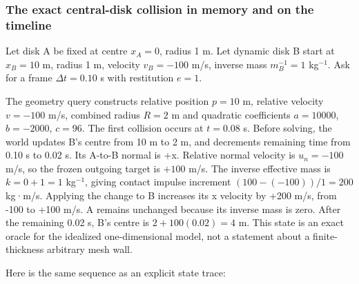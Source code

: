 \subsubsection{The exact central-disk collision in memory and on the timeline}\label{06-engine-ii-ch046-the-exact-central-disk-collision-in-memory-and-on-the-timeline}

\hypertarget{06-engine-ii-ch046-the-exact-central-disk-collision-in-memory-and-on-the-timeline}{}

Let disk A be fixed at centre \(x_A=0\), radius 1 m. Let dynamic disk B start at \(x_B=10\) m, radius 1 m, velocity \(v_B=-100\) m/s, inverse mass \(m_B^{-1}=1\) kg\(^{-1}\). Ask for a frame \(\Delta t=0.10\) s with restitution \(e=1\).

The geometry query constructs relative position \(p=10\) m, relative velocity \(v=-100\) m/s, combined radius \(R=2\) m and quadratic coefficients \(a=10000\), \(b=-2000\), \(c=96\). The first collision occurs at \(t=0.08\) s. Before solving, the world updates B's centre from 10 m to 2 m, and decrements remaining time from 0.10 s to 0.02 s. Its A-to-B normal is +x. Relative normal velocity is \(u_n=-100\) m/s, so the frozen outgoing target is \(+100\) m/s. The inverse effective mass is \(k=0+1=1\) kg\(^{-1}\), giving contact impulse increment \((100-(-100))/1=200\) kg·m/s. Applying the change to B increases its x velocity by +200 m/s, from -100 to +100 m/s. A remains unchanged because its inverse mass is zero. After the remaining 0.02 s, B's centre is \(2+100(0.02)=4\) m. This state is an exact oracle for the idealized one-dimensional model, not a statement about a finite-thickness arbitrary mesh wall.

Here is the same sequence as an explicit state trace:

